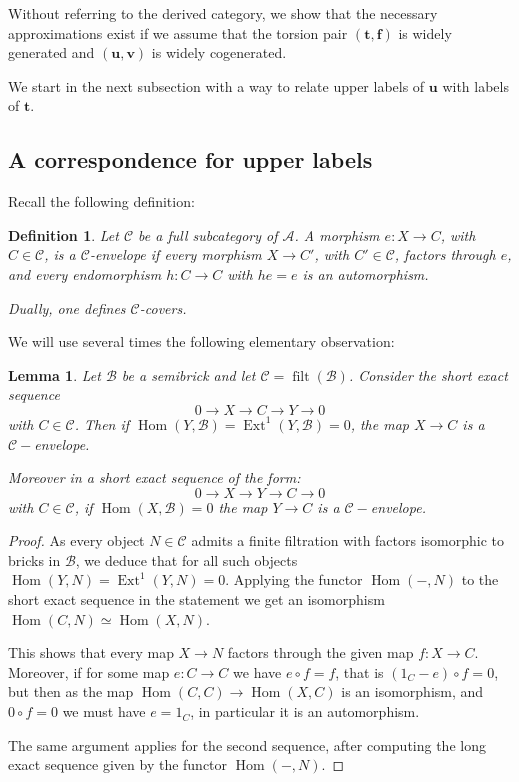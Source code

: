 \documentclass[10pt,a4paper]{amsart}
\newtheorem{lemma}[theorem]{Lemma}
\newtheorem{definition}[theorem]{Definition}
\newcommand{\A}{\mathcal A}
\newcommand{\B}{\mathcal B}
\newcommand{\filt}{\operatorname{filt}}
\newcommand{\Hom}{\operatorname{Hom}}
\newcommand{\Ext}{\operatorname{Ext}}
\newcommand{\tpair}[2]{(\mathbf{#1}, \mathbf{#2})  }
\begin{document}
Without referring to the derived category, we show that the necessary approximations exist  if we assume that  the torsion pair \( \tpair{t}{f} \) is widely generated and \( \tpair{u}{v} \) is widely cogenerated.

We start in the next subsection with a way to relate upper labels of \( \mathbf{u} \) with labels of \( \mathbf{t} \).

\subsection{A correspondence for upper labels}

Recall the following definition:

\begin{definition}
Let \(\mathcal C\) be a full subcategory of \(\A\). A morphism \(e:X\to C\), with \(C\in\mathcal C\), is a \(\mathcal C\)-envelope if every morphism \(X\to C'\), with \(C'\in\mathcal C\), factors through \(e\), and every endomorphism \(h:C\to C\) with \(he=e\) is an automorphism.

Dually, one defines \( \mathcal C\)-covers.
\end{definition}

We will use several times the following elementary observation:

\begin{lemma}
\label{lem:approxim-lem}
Let $ \B $ be a semibrick and let $ \mathcal{C} = \filt(\B) $. Consider the short exact sequence
\[
0 \to X \to C \to Y \to 0
\]
with $ C \in \mathcal{C} $. Then if $ \Hom(Y, \B) = \Ext^1(Y, \B) = 0 $, the map $ X \to C $ is a $ \mathcal{C}-$envelope.

Moreover in a short exact sequence of the form:
\[
0 \to X \to Y \to C \to 0
\]
with $ C \in \mathcal{C} $, if $ \Hom(X, \B) = 0 $ the map $ Y \to C $ is a $ \mathcal{C}-$envelope.
\end{lemma}

\begin{proof}
As every object $ N \in \mathcal{C} $ admits a finite filtration with factors isomorphic to bricks in $ \B $, we deduce that for all such objects  $ \Hom(Y, N) = \Ext^1(Y, N) = 0 $. Applying the functor $ \Hom(-, N) $ to the short exact sequence in the statement we get an isomorphism $ \Hom(C, N) \simeq \Hom(X, N) $.  

This shows that every map $ X \to N $ factors through the given map $ f :  X \to C $. Moreover, if for some map $ e : C \to C $ we have $ e \circ f = f $, that is $ (1_C - e) \circ f = 0 $, but then as the map $ \Hom(C, C) \to \Hom(X, C) $ is an isomorphism, and $ 0 \circ f = 0 $ we must have $ e = 1_C $, in particular it is an automorphism.

The same argument applies for the second sequence, after computing the long exact sequence given by the functor $ \Hom(-, N) $.
\end{proof}
\end{document}
